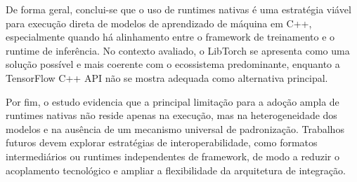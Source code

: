 De forma geral, conclui-se que o uso de runtimes nativas é uma estratégia viável para
execução direta de modelos de aprendizado de máquina em C++, especialmente quando há
alinhamento entre o framework de treinamento e o runtime de inferência. No contexto
avaliado, o LibTorch se apresenta como uma solução possível e mais coerente com o
ecossistema predominante, enquanto a TensorFlow C++ API não se mostra adequada como
alternativa principal.

Por fim, o estudo evidencia que a principal limitação para a adoção ampla de runtimes
nativas não reside apenas na execução, mas na heterogeneidade dos modelos e na ausência
de um mecanismo universal de padronização. Trabalhos futuros devem explorar estratégias
de interoperabilidade, como formatos intermediários ou runtimes independentes de
framework, de modo a reduzir o acoplamento tecnológico e ampliar a flexibilidade da
arquitetura de integração.